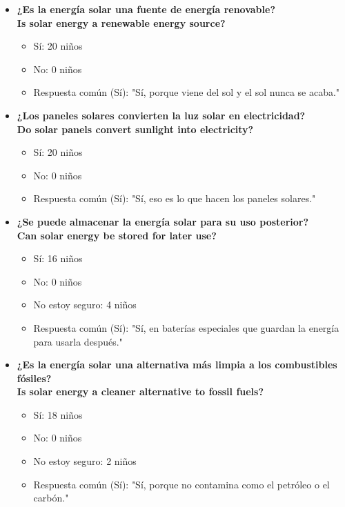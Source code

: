 \documentclass[12pt]{article}
\begin{document}
\begin{itemize}
      \item \textbf{¿Es la energía solar una fuente de energía renovable?}\\
            \textbf{Is solar energy a renewable energy source?}
            \begin{itemize}
                  \item Sí: 20 niños
                  \item No: 0 niños
                  \item Respuesta común (Sí): "Sí, porque viene del sol y el sol nunca se acaba."
            \end{itemize}

      \item \textbf{¿Los paneles solares convierten la luz solar en electricidad?}\\
            \textbf{Do solar panels convert sunlight into electricity?}
            \begin{itemize}
                  \item Sí: 20 niños
                  \item No: 0 niños
                  \item Respuesta común (Sí): "Sí, eso es lo que hacen los paneles solares."
            \end{itemize}

      \item \textbf{¿Se puede almacenar la energía solar para su uso posterior?}\\
            \textbf{Can solar energy be stored for later use?}
            \begin{itemize}
                  \item Sí: 16 niños
                  \item No: 0 niños
                  \item No estoy seguro: 4 niños
                  \item Respuesta común (Sí): "Sí, en baterías especiales que guardan la energía para usarla después."
            \end{itemize}

      \item \textbf{¿Es la energía solar una alternativa más limpia a los combustibles fósiles?}\\
            \textbf{Is solar energy a cleaner alternative to fossil fuels?}
            \begin{itemize}
                  \item Sí: 18 niños
                  \item No: 0 niños
                  \item No estoy seguro: 2 niños
                  \item Respuesta común (Sí): "Sí, porque no contamina como el petróleo o el carbón."
            \end{itemize}


\end{itemize}
\end{document}
